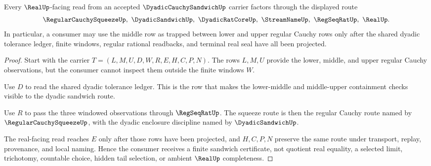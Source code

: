 \begin{theorem}
\label{thm:dyadic-cauchy-sandwich-squeeze-route}
Every $\RealUp$-facing read from an accepted $\DyadicCauchySandwichUp$ carrier factors through the displayed route
$$
\RegularCauchySqueezeUp,\ \DyadicSandwichUp,\ \DyadicRatCoreUp,\ \StreamNameUp,\ \RegSeqRatUp,\ \RealUp .
$$
In particular, a consumer may use the middle row as trapped between lower and upper regular Cauchy rows only after the shared dyadic tolerance ledger, finite windows, regular rational readbacks, and terminal real seal have all been projected.
\end{theorem}
\begin{proof}
Start with the carrier $T=(L,M,U,D,W,R,E,H,C,P,N)$. The rows $L,M,U$ provide the lower, middle, and upper regular Cauchy observations, but the consumer cannot inspect them outside the finite windows $W$.

Use $D$ to read the shared dyadic tolerance ledger. This is the row that makes the lower-middle and middle-upper containment checks visible to the dyadic sandwich route.

Use $R$ to pass the three windowed observations through $\RegSeqRatUp$. The squeeze route is then the regular Cauchy route named by $\RegularCauchySqueezeUp$, with the dyadic enclosure discipline named by $\DyadicSandwichUp$.

The real-facing read reaches $E$ only after those rows have been projected, and $H,C,P,N$ preserve the same route under transport, replay, provenance, and local naming. Hence the consumer receives a finite sandwich certificate, not quotient real equality, a selected limit, trichotomy, countable choice, hidden tail selection, or ambient $\RealUp$ completeness.
\end{proof}



